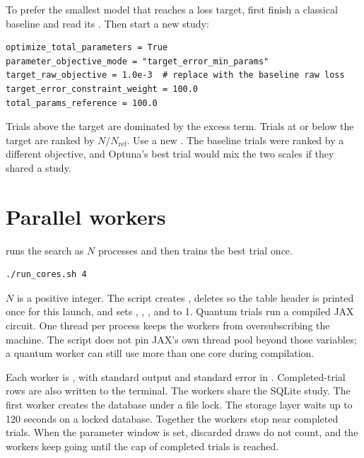 To prefer the smallest model that reaches a loss target, first finish a classical baseline and read its .
Then start a new study:

\begin{lstlisting}
optimize_total_parameters = True
parameter_objective_mode = "target_error_min_params"
target_raw_objective = 1.0e-3  # replace with the baseline raw loss
target_error_constraint_weight = 100.0
total_params_reference = 100.0
\end{lstlisting}

Trials above the target are dominated by the excess term.
Trials at or below the target are ranked by \(N/N_{\mathrm{ref}}\).
Use a new .
The baseline trials were ranked by a different objective, and Optuna's best trial would mix the two scales if they shared a study.

\section{Parallel workers}

 runs the search as \(N\) processes and then trains the best trial once.

\begin{lstlisting}[style=sh]
./run_cores.sh 4
\end{lstlisting}

\(N\) is a positive integer.
The script creates , deletes  so the table header is printed once for this launch, and sets
, , , and  to 1.
Quantum trials run a compiled JAX circuit.
One thread per process keeps the workers from oversubscribing the machine.
The script does not pin JAX's own thread pool beyond those variables; a quantum worker can still use more than one core during compilation.

Each worker is , with standard output and standard error in .
Completed-trial rows are also written to the terminal.
The workers share the SQLite study.
The first worker creates the database under a file lock.
The storage layer waits up to 120 seconds on a locked database.
Together the workers stop near  completed trials.
When the parameter window is set, discarded draws do not count, and the workers keep going until the cap of completed trials is reached.

